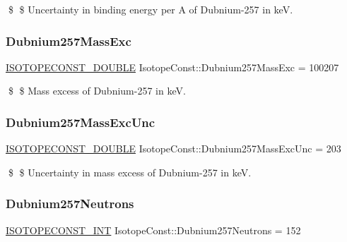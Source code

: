 \$ \$ Uncertainty in binding energy per A of Dubnium-\/257 in keV. \mbox{\label{group___isotope_const-_dubnium-_db257_ga5d5207655b212246e5fbeaa468c28fa6}} 
\subsubsection{\texorpdfstring{Dubnium257\+Mass\+Exc}{Dubnium257MassExc}}
{\footnotesize\ttfamily \mbox{\hyperlink{group___isotope_const-_macros_ga8f45a7272ce02c0b4c65c44636ed719a}{I\+S\+O\+T\+O\+P\+E\+C\+O\+N\+S\+T\+\_\+\+D\+O\+U\+B\+LE}} Isotope\+Const\+::\+Dubnium257\+Mass\+Exc = 100207}

\$ \$ Mass excess of Dubnium-\/257 in keV. \mbox{\label{group___isotope_const-_dubnium-_db257_gaceaecabd5b67aea1a8bc0c93c58f82cf}} 
\subsubsection{\texorpdfstring{Dubnium257\+Mass\+Exc\+Unc}{Dubnium257MassExcUnc}}
{\footnotesize\ttfamily \mbox{\hyperlink{group___isotope_const-_macros_ga8f45a7272ce02c0b4c65c44636ed719a}{I\+S\+O\+T\+O\+P\+E\+C\+O\+N\+S\+T\+\_\+\+D\+O\+U\+B\+LE}} Isotope\+Const\+::\+Dubnium257\+Mass\+Exc\+Unc = 203}

\$ \$ Uncertainty in mass excess of Dubnium-\/257 in keV. \mbox{\label{group___isotope_const-_dubnium-_db257_gab2e77c0612f8385d0abad835862a12a7}} 
\subsubsection{\texorpdfstring{Dubnium257\+Neutrons}{Dubnium257Neutrons}}
{\footnotesize\ttfamily \mbox{\hyperlink{group___isotope_const-_macros_ga5f18360b3e99483a35c32d789e62621c}{I\+S\+O\+T\+O\+P\+E\+C\+O\+N\+S\+T\+\_\+\+I\+NT}} Isotope\+Const\+::\+Dubnium257\+Neutrons = 152}

